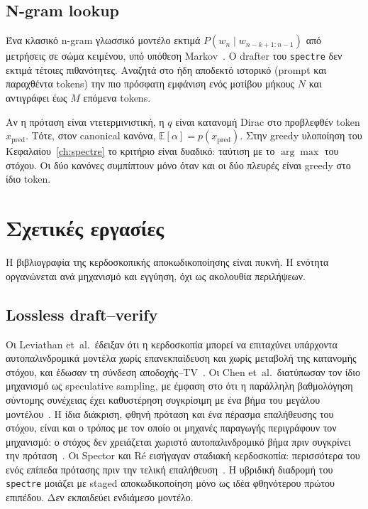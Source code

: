 \documentclass[a4paper,12pt]{report}
\theoremstyle{plain}
\theoremstyle{definition}
\theoremstyle{remark}
\begin{document}
\section{N-gram lookup}

Ένα κλασικό n-gram γλωσσικό μοντέλο εκτιμά \(P(w_n\mid w_{n-k+1:n-1})\) από
μετρήσεις σε σώμα κειμένου, υπό υπόθεση Markov~\cite{jurafsky2025slp}. Ο
drafter του \texttt{spectre} δεν εκτιμά τέτοιες πιθανότητες. Αναζητά στο ήδη
αποδεκτό ιστορικό (prompt και παραχθέντα tokens) την πιο πρόσφατη εμφάνιση
ενός μοτίβου μήκους \(N\) και αντιγράφει έως \(M\) επόμενα tokens.

Αν η πρόταση είναι ντετερμινιστική, η \(q\) είναι κατανομή Dirac στο
προβλεφθέν token \(x_{\mathrm{pred}}\). Τότε, στον canonical κανόνα,
\(\mathbb{E}[\alpha]=p(x_{\mathrm{pred}})\). Στην greedy υλοποίηση του
Κεφαλαίου~\ref{ch:spectre} το κριτήριο είναι δυαδικό: ταύτιση με το
\(\arg\max\) του στόχου. Οι δύο κανόνες συμπίπτουν μόνο όταν και οι δύο πλευρές
είναι greedy στο ίδιο token.

\chapter{Σχετικές εργασίες}
\label{ch:related}

Η βιβλιογραφία της κερδοσκοπικής αποκωδικοποίησης είναι πυκνή. Η ενότητα
οργανώνεται ανά μηχανισμό και εγγύηση, όχι ως ακολουθία περιλήψεων.

\section{Lossless draft--verify}

Οι Leviathan et~al.\ έδειξαν ότι η κερδοσκοπία μπορεί να επιταχύνει υπάρχοντα
αυτοπαλινδρομικά μοντέλα χωρίς επανεκπαίδευση και χωρίς μεταβολή της
κατανομής στόχου, και έδωσαν τη σύνδεση αποδοχής--TV~\cite{leviathan2023fast}.
Οι Chen et~al.\ διατύπωσαν τον ίδιο μηχανισμό ως speculative sampling, με
έμφαση στο ότι η παράλληλη βαθμολόγηση σύντομης συνέχειας έχει καθυστέρηση
συγκρίσιμη με ένα βήμα του μεγάλου μοντέλου~\cite{chen2023accelerating}.
Η ίδια διάκριση, φθηνή πρόταση και ένα πέρασμα επαλήθευσης του στόχου, είναι
και ο τρόπος με τον οποίο οι μηχανές παραγωγής περιγράφουν τον μηχανισμό:
ο στόχος δεν χρειάζεται χωριστό αυτοπαλινδρομικό βήμα πριν συγκρίνει την
πρόταση~\cite{vllm-speculative-docs,vllm-speculators-docs}. Οι Spector και
R\'e εισήγαγαν σταδιακή κερδοσκοπία: περισσότερα του ενός επίπεδα
πρότασης πριν την τελική επαλήθευση~\cite{spector2023staged}. Η υβριδική
διαδρομή του \texttt{spectre} μοιάζει με staged αποκωδικοποίηση μόνο ως
ιδέα φθηνότερου πρώτου επιπέδου. Δεν εκπαιδεύει ενδιάμεσο μοντέλο.
\end{document}
